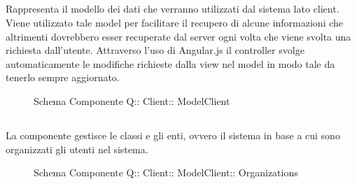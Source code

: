 \subsection{}
Rappresenta il modello dei dati che verranno utilizzati dal sistema lato client. Viene utilizzato tale model per facilitare il recupero di alcune informazioni che altrimenti dovrebbero esser recuperate dal server ogni volta che viene svolta una richiesta dall'utente.
Attraverso l'uso di Angular.js il controller svolge automaticamente le modifiche richieste dalla view nel model in modo tale da tenerlo sempre aggiornato.
\begin{figure}[H]
\centering
\noindent{}
\caption[Schema Componente Quizzipedia::Client::ModelClient]{Schema Componente Q:: Client:: ModelClient}
\end{figure}
\subsection{}
La componente gestisce le classi e gli enti, ovvero il sistema in base a cui sono organizzati gli utenti nel sistema.
\begin{figure}[H]
\centering
\noindent{}
\caption[Schema Componente Quizzipedia::Client::ModelClient::Organizations]{Schema Componente Q:: Client:: ModelClient:: Organizations}
\end{figure}

